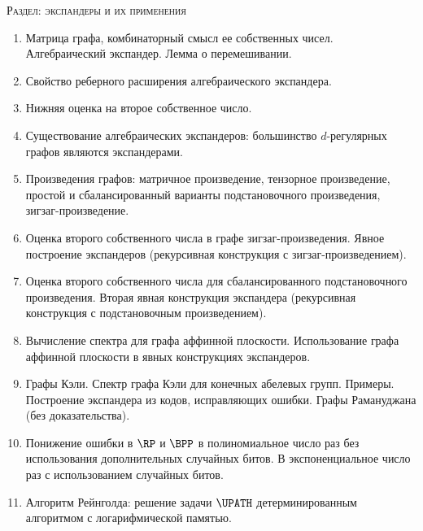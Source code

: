 \centerline{\textsc{Раздел: экспандеры и их применения}}

\begin{enumerate}
    \item Матрица графа, комбинаторный смысл ее собственных чисел. Алгебраический экспандер. Лемма о
        перемешивании.
    \item Свойство реберного расширения алгебраического экспандера.
    \item Нижняя оценка на второе собственное число.
    \item Существование алгебраических экспандеров: большинство $d$-регулярных графов являются
        экспандерами.
    \item Произведения графов: матричное произведение, тензорное произведение, простой и сбалансированный
        варианты подстановочного произведения, зигзаг-произведение.
    \item Оценка второго собственного числа в графе зигзаг-произведения. Явное построение экспандеров
        (рекурсивная конструкция с зигзаг-произведением).
    \item Оценка второго собственного числа для сбалансированного подстановочного произведения. Вторая
        явная конструкция экспандера (рекурсивная конструкция с подстановочным произведением).
    \item Вычисление спектра для графа аффинной плоскости. Использование графа аффинной плоскости в явных
        конструкциях экспандеров.
    \item Графы Кэли. Спектр графа Кэли для конечных абелевых групп. Примеры. Построение экспандера из
        кодов, исправляющих ошибки. Графы Рамануджана (без доказательства).
    \item Понижение ошибки в $\RP$ и $\BPP$ в полиномиальное число раз без использования
        дополнительных случайных битов. В экспоненциальное число раз с использованием случайных битов.
    \item Алгоритм Рейнголда: решение задачи $\UPATH$ детерминированным алгоритмом с логарифмической
        памятью.
\end{enumerate}


